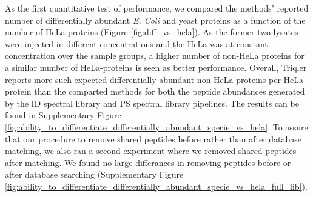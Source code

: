 \documentclass[10pt,letterpaper]{article}
\begin{document}
As the first quantitative test of performance, we compared the methods' reported number of differentially abundant {\em E. Coli} and yeast proteins as a function of the number of HeLa proteins (Figure \ref{fig:diff_vs_hela}). As the former two lysates were injected in different concentrations and the HeLa was at constant concentration over the sample groups, a higher number of non-HeLa proteins for a similar number of HeLa-proteins is seen as better performance.  Overall, Triqler reports more such expected differentially abundant non-HeLa proteins per HeLa protein than the comparted methods for both the peptide abundances generated by the ID spectral library and PS spectral library pipelines. The results can be found in Supplementary Figure \ref{fig:ability_to_differentiate_differentially_abundant_specie_vs_hela}. To assure that our procedure to remove shared peptides before rather than after database matching, we also ran a second experiment where we removed shared peptides after matching. We found no large differances in removing peptides before or after database searching (Supplementary Figure \ref{fig:ability_to_differentiate_differentially_abundant_specie_vs_hela_full_lib}).
\end{document}
